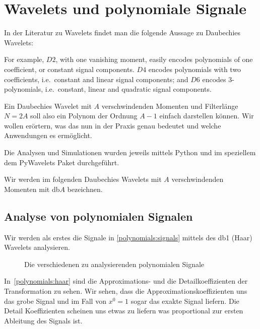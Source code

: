 %
%
%
\chapter{Wavelets und polynomiale Signale\label{chapter:thema}}
\begin{refsection}

In der Literatur zu Wavelets findet man die folgende Aussage zu Daubechies
Wavelets:
\begin{displayquote}
For example, $D2$, with one vanishing moment, easily encodes polynomials of one
coefficient, or constant signal components. $D4$ encodes polynomials with two
coefficients, i.e.\ constant and linear signal components; and $D6$ encodes
3-polynomials, i.e.\ constant, linear and quadratic signal components.
\end{displayquote}
Ein Daubechies Wavelet mit $A$ verschwindenden Momenten und Filterlänge $N=2A$
soll also ein Polynom der Ordnung $A-1$ einfach darstellen können. Wir wollen
erörtern, was das nun in der Praxis genau bedeutet und welche Anwendungen es
ermöglicht.

Die Analysen und Simulationen wurden jeweils mittels Python \cite{python} und im
speziellem dem PyWavelets \cite{gregory_r_lee_2019_2634243} Paket durchgeführt.

Wir werden im folgenden Daubechies Wavelets mit $A$ verschwindenden Momenten mit
db$A$ bezeichnen.

\section{Analyse von polynomialen Signalen}

Wir werden als erstes die Signale in \autoref{polynomials:signals} mittels des db1
(Haar) Wavelets analysieren.

\begin{figure}
    \centering
    
    \caption{Die verschiedenen zu analysierenden polynomialen Signale\label{polynomials:signals}}
\end{figure}

In~\autoref{polynomials:haar} sind die Approximations- und die Detailkoeffizienten
der Transformation zu sehen. Wir sehen, dass die Approximationskoeffizienten
uns das grobe Signal und im Fall von $x^0 = 1$ sogar das exakte Signal liefern. Die
Detail Koeffizienten scheinen uns etwas zu liefern was proportional zur ersten
Ableitung des Signals ist.


\end{refsection}
